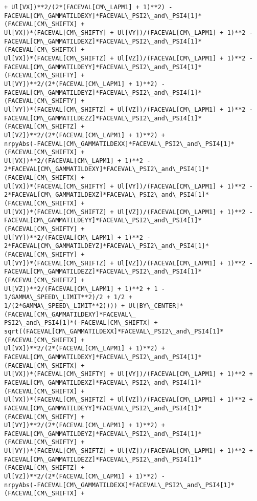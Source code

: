 \documentclass[landscape,letterpaper,10pt,english]{article}
\begin{document}
\begin{Verbatim}[commandchars=\\\{\}]
+ Ul[VX])**2/(2*(FACEVAL[CM\_LAPM1] + 1)**2) -
FACEVAL[CM\_GAMMATILDEXY]*FACEVAL\_PSI2\_and\_PSI4[1]*(FACEVAL[CM\_SHIFTX] +
Ul[VX])*(FACEVAL[CM\_SHIFTY] + Ul[VY])/(FACEVAL[CM\_LAPM1] + 1)**2 -
FACEVAL[CM\_GAMMATILDEXZ]*FACEVAL\_PSI2\_and\_PSI4[1]*(FACEVAL[CM\_SHIFTX] +
Ul[VX])*(FACEVAL[CM\_SHIFTZ] + Ul[VZ])/(FACEVAL[CM\_LAPM1] + 1)**2 -
FACEVAL[CM\_GAMMATILDEYY]*FACEVAL\_PSI2\_and\_PSI4[1]*(FACEVAL[CM\_SHIFTY] +
Ul[VY])**2/(2*(FACEVAL[CM\_LAPM1] + 1)**2) -
FACEVAL[CM\_GAMMATILDEYZ]*FACEVAL\_PSI2\_and\_PSI4[1]*(FACEVAL[CM\_SHIFTY] +
Ul[VY])*(FACEVAL[CM\_SHIFTZ] + Ul[VZ])/(FACEVAL[CM\_LAPM1] + 1)**2 -
FACEVAL[CM\_GAMMATILDEZZ]*FACEVAL\_PSI2\_and\_PSI4[1]*(FACEVAL[CM\_SHIFTZ] +
Ul[VZ])**2/(2*(FACEVAL[CM\_LAPM1] + 1)**2) +
nrpyAbs(-FACEVAL[CM\_GAMMATILDEXX]*FACEVAL\_PSI2\_and\_PSI4[1]*(FACEVAL[CM\_SHIFTX] +
Ul[VX])**2/(FACEVAL[CM\_LAPM1] + 1)**2 -
2*FACEVAL[CM\_GAMMATILDEXY]*FACEVAL\_PSI2\_and\_PSI4[1]*(FACEVAL[CM\_SHIFTX] +
Ul[VX])*(FACEVAL[CM\_SHIFTY] + Ul[VY])/(FACEVAL[CM\_LAPM1] + 1)**2 -
2*FACEVAL[CM\_GAMMATILDEXZ]*FACEVAL\_PSI2\_and\_PSI4[1]*(FACEVAL[CM\_SHIFTX] +
Ul[VX])*(FACEVAL[CM\_SHIFTZ] + Ul[VZ])/(FACEVAL[CM\_LAPM1] + 1)**2 -
FACEVAL[CM\_GAMMATILDEYY]*FACEVAL\_PSI2\_and\_PSI4[1]*(FACEVAL[CM\_SHIFTY] +
Ul[VY])**2/(FACEVAL[CM\_LAPM1] + 1)**2 -
2*FACEVAL[CM\_GAMMATILDEYZ]*FACEVAL\_PSI2\_and\_PSI4[1]*(FACEVAL[CM\_SHIFTY] +
Ul[VY])*(FACEVAL[CM\_SHIFTZ] + Ul[VZ])/(FACEVAL[CM\_LAPM1] + 1)**2 -
FACEVAL[CM\_GAMMATILDEZZ]*FACEVAL\_PSI2\_and\_PSI4[1]*(FACEVAL[CM\_SHIFTZ] +
Ul[VZ])**2/(FACEVAL[CM\_LAPM1] + 1)**2 + 1 - 1/GAMMA\_SPEED\_LIMIT**2)/2 + 1/2 +
1/(2*GAMMA\_SPEED\_LIMIT**2)))) + Ul[BY\_CENTER]*(FACEVAL[CM\_GAMMATILDEXY]*FACEVAL\_
PSI2\_and\_PSI4[1]*(-FACEVAL[CM\_SHIFTX] +
sqrt((FACEVAL[CM\_GAMMATILDEXX]*FACEVAL\_PSI2\_and\_PSI4[1]*(FACEVAL[CM\_SHIFTX] +
Ul[VX])**2/(2*(FACEVAL[CM\_LAPM1] + 1)**2) +
FACEVAL[CM\_GAMMATILDEXY]*FACEVAL\_PSI2\_and\_PSI4[1]*(FACEVAL[CM\_SHIFTX] +
Ul[VX])*(FACEVAL[CM\_SHIFTY] + Ul[VY])/(FACEVAL[CM\_LAPM1] + 1)**2 +
FACEVAL[CM\_GAMMATILDEXZ]*FACEVAL\_PSI2\_and\_PSI4[1]*(FACEVAL[CM\_SHIFTX] +
Ul[VX])*(FACEVAL[CM\_SHIFTZ] + Ul[VZ])/(FACEVAL[CM\_LAPM1] + 1)**2 +
FACEVAL[CM\_GAMMATILDEYY]*FACEVAL\_PSI2\_and\_PSI4[1]*(FACEVAL[CM\_SHIFTY] +
Ul[VY])**2/(2*(FACEVAL[CM\_LAPM1] + 1)**2) +
FACEVAL[CM\_GAMMATILDEYZ]*FACEVAL\_PSI2\_and\_PSI4[1]*(FACEVAL[CM\_SHIFTY] +
Ul[VY])*(FACEVAL[CM\_SHIFTZ] + Ul[VZ])/(FACEVAL[CM\_LAPM1] + 1)**2 +
FACEVAL[CM\_GAMMATILDEZZ]*FACEVAL\_PSI2\_and\_PSI4[1]*(FACEVAL[CM\_SHIFTZ] +
Ul[VZ])**2/(2*(FACEVAL[CM\_LAPM1] + 1)**2) -
nrpyAbs(-FACEVAL[CM\_GAMMATILDEXX]*FACEVAL\_PSI2\_and\_PSI4[1]*(FACEVAL[CM\_SHIFTX] +

\end{Verbatim}
\end{document}
